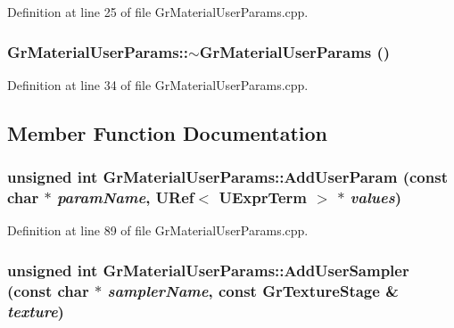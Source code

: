 Definition at line 25 of file GrMaterialUserParams.cpp.\hypertarget{class_gr_material_user_params_365386d0f8e5941409d30cc2d708bf5e}{
\subsubsection[{$\sim$GrMaterialUserParams}]{\setlength{\rightskip}{0pt plus 5cm}GrMaterialUserParams::$\sim$GrMaterialUserParams ()}}
\label{class_gr_material_user_params_365386d0f8e5941409d30cc2d708bf5e}




Definition at line 34 of file GrMaterialUserParams.cpp.

\subsection{Member Function Documentation}
\hypertarget{class_gr_material_user_params_dc63d586a7e83e6f113bf386f60d47d4}{
\subsubsection[{AddUserParam}]{\setlength{\rightskip}{0pt plus 5cm}unsigned int GrMaterialUserParams::AddUserParam (const char $\ast$ {\em paramName}, \/  {\bf URef}$<$ {\bf UExprTerm} $>$ $\ast$ {\em values})}}
\label{class_gr_material_user_params_dc63d586a7e83e6f113bf386f60d47d4}




Definition at line 89 of file GrMaterialUserParams.cpp.\hypertarget{class_gr_material_user_params_5270ccaad9a2fb6b0a00e6bb1d4a6377}{
\subsubsection[{AddUserSampler}]{\setlength{\rightskip}{0pt plus 5cm}unsigned int GrMaterialUserParams::AddUserSampler (const char $\ast$ {\em samplerName}, \/  const {\bf GrTextureStage} \& {\em texture})}}
\label{class_gr_material_user_params_5270ccaad9a2fb6b0a00e6bb1d4a6377}




